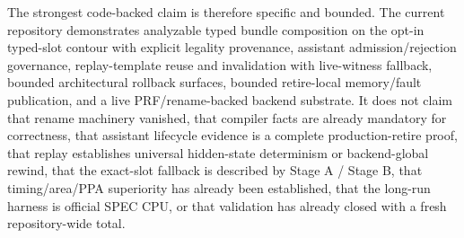 \documentclass[twocolumn]{article}
\begin{document}
The strongest code-backed claim is therefore specific and bounded. The current repository demonstrates analyzable typed bundle composition on the opt-in typed-slot contour with explicit legality provenance, assistant admission/rejection governance, replay-template reuse and invalidation with live-witness fallback, bounded architectural rollback surfaces, bounded retire-local memory/fault publication, and a live PRF/rename-backed backend substrate. It does not claim that rename machinery vanished, that compiler facts are already mandatory for correctness, that assistant lifecycle evidence is a complete production-retire proof, that replay establishes universal hidden-state determinism or backend-global rewind, that the exact-slot fallback is described by Stage A / Stage B, that timing/area/PPA superiority has already been established, that the long-run harness is official SPEC CPU, or that validation has already closed with a fresh repository-wide total.
\end{document}
